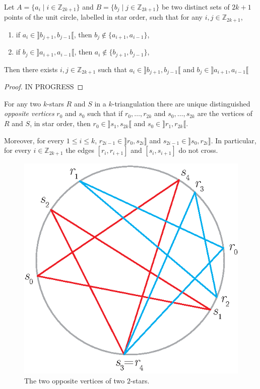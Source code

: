 \documentclass[12pt]{amsart}
\begin{document}
\begin{lemma}
Let $A=\{a_i\;|\; i\in\mathbb{Z}_{2k+1}\}$ and $B=\{b_j\;|\; j\in\mathbb{Z}_{2k+1}\}$ be two distinct sets of $2k+1$ points of the unit circle, labelled in star order, such that for any $i,j\in\mathbb{Z}_{2k+1}$,
\begin{enumerate}
\item if $a_i\in\rrbracket b_{j+1},b_{j-1}\llbracket$, then $b_j\notin\{a_{i+1},a_{i-1}\}$,
\item if $b_j\in\rrbracket a_{i+1},a_{i-1}\llbracket$, then $a_i\notin\{b_{j+1},b_{j-1}\}$,
\end{enumerate}
Then there exists $i,j\in\mathbb{Z}_{2k+1}$ such that $a_i\in\rrbracket b_{j+1},b_{j-1}\llbracket$ and $b_j\in\rrbracket a_{i+1},a_{i-1}\llbracket$
\end{lemma}

\begin{proof}
IN PROGRESS
\end{proof}

\begin{theorem}\label{oppositevertices}
For any two $k$-stars $R$ and $S$ in a $k$-triangulation there are unique distinguished \emph{opposite vertices} $r_0$ and $s_0$ such that if $r_0,\dots,r_{2k}$ and $s_0,\dots, s_{2k}$ are the vertices of $R$ and $S$, in star order, then $r_0\in\rrbracket s_1,s_{2k}\llbracket$ and $s_0\in\rrbracket r_1,r_{2k}\llbracket$.

Moreover, for every $1\le i\le k$, $r_{2i-1}\in\rrbracket r_0,s_{2i}\rrbracket$ and $s_{2i-1}\in\rrbracket s_0,r_{2i}\rrbracket$.
In particular, for every $i\in\mathbb{Z}_{2k+1}$ the edges $[r_i,r_{i+1}]$ and $[s_i,s_{i+1}]$ do not cross.
\end{theorem}

\begin{figure}
\centerline{\includegraphics[scale=1]{oppvert.eps}}
\caption{\small{The two opposite vertices of two $2$-stars.}}\label{oppvert}
\end{figure}
\end{document}

